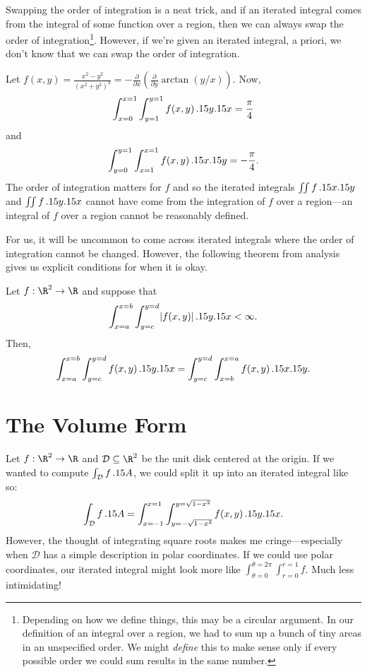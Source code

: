 Swapping the order of integration is a neat trick, and if an
iterated integral comes from the integral of some function over a
region, then we can always swap the order of integration\footnote{ Depending
on how we define things, this may be a circular argument.  In our definition
of an integral over a region, we had to sum up a bunch of tiny areas in an unspecified
order.  We might \emph{define} this to make sense only if every possible order we could
sum results in the same number.}.  However, if we're given an iterated integral,
a priori, we don't know that we can swap the order of integration.

\begin{example}
	Let $f(x,y)=\frac{x^2-y^2}{(x^2+y^2)^2} = 
	-\tfrac{\partial}{\partial x}\left(\tfrac{\partial}{\partial y}\arctan(y/x)\right)$.  Now,
	\[
		\int_{x=0}^{x=1}\int_{y=1}^{y=1} f(x,y)\,.15 y.15 x = \frac{\pi}{4}
	\]
	and
	\[
		\int_{y=0}^{y=1}\int_{x=1}^{x=1} f(x,y)\,.15 x.15 y = -\frac{\pi}{4}.
	\]
	The order of integration matters for $f$ and so the iterated integrals $\iint f\, .15 x.15 y$
	and $\iint f\,.15 y.15 x$ cannot have come from the integration of $f$ over a region---an
	integral of $f$ over a region cannot be reasonably defined.
\end{example}

For us, it will be uncommon to come across iterated integrals where the order of integration
cannot be changed.  However, the following theorem from analysis gives us explicit conditions
for when it is okay.

\begin{theorem}
	Let $f:\R^2\to \R$ and suppose that 
	\[
		\int_{x=a}^{x=b}\int_{y=c}^{y=d} \lvert f(x,y)\rvert\,.15 y.15 x < \infty.
	\]
	Then,
	\[
		\int_{x=a}^{x=b}\int_{y=c}^{y=d} f(x,y)\,.15 y.15 x =
		\int_{y=c}^{y=d}\int_{x=b}^{x=a} f(x,y)\,.15 x.15 y.
	\]
\end{theorem}

\begin{exercises}
\end{exercises}

\section{The Volume Form}

Let $f:\R^2\to \R$ and $\mathcal D\subseteq \R^2$ be the unit disk centered at the origin.
If we wanted to compute $\int_{\mathcal D} f\,.15 A$, we could split it up into an iterated
integral like so:
\[
	\int_{\mathcal D} f\,.15 A = \int_{x=-1}^{x=1}\int_{y=-\sqrt{1-x^2}}^{y=\sqrt{1-x^2}} f(x,y)\,.15 y.15 x.
\]
However, the thought of integrating square roots makes me cringe---especially when $\mathcal D$ has
a simple description in polar coordinates.  If we could use polar coordinates, our iterated
integral might look more like $\int_{\theta=0}^{\theta=2\pi}\int_{r=0}^{r=1} f$.  Much less intimidating!

